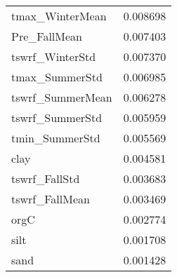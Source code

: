 \begin{tabular}{lr}
tmax_WinterMean & 0.008698 \\
Pre_FallMean & 0.007403 \\
tswrf_WinterStd & 0.007370 \\
tmax_SummerStd & 0.006985 \\
tswrf_SummerMean & 0.006278 \\
tswrf_SummerStd & 0.005959 \\
tmin_SummerStd & 0.005569 \\
clay & 0.004581 \\
tswrf_FallStd & 0.003683 \\
tswrf_FallMean & 0.003469 \\
orgC & 0.002774 \\
silt & 0.001708 \\
sand & 0.001428 \\
\bottomrule
\end{tabular}
